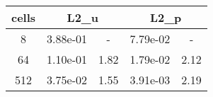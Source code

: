\documentclass[10pt]{report}
\begin{document}
\begin{table}[H]
\begin{center}
\begin{tabular}{|c|c|c|c|c|} \hline
cells & 
\multicolumn{2}{|c|}{L2_u} & 
\multicolumn{2}{|c|}{L2_p}\\ \hline
8 & 3.88e-01 & - & 7.79e-02 & -\\ \hline
64 & 1.10e-01 & 1.82 & 1.79e-02 & 2.12\\ \hline
512 & 3.75e-02 & 1.55 & 3.91e-03 & 2.19\\ \hline
\end{tabular}
\end{center}
\end{table}
\end{document}
